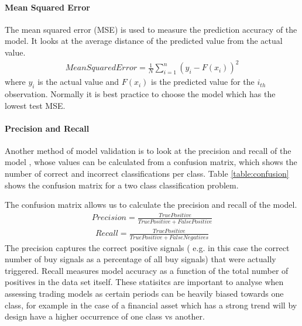 \documentclass[11pt]{article}
\begin{document}
\paragraph{Mean Squared Error}
The mean squared error (MSE) is used to measure the prediction accuracy of the model. It looks at the average distance of the predicted value from the actual value.
\begin{align}
Mean Squared Error = \frac{1}{N}\sum^{n}_{i = 1} (y_{i}-F(x_{i}))^{2} 
\end{align}
where $y_{i}$ is the actual value and $F(x_{i})$ is the predicted value for the $i_{th}$ observation. Normally it is best practice to choose the model which has the lowest test MSE. \newline
\paragraph{Precision and Recall}
Another method of model validation is to look at the precision and recall of the model \cite{Patel2015}, whose values can be calculated from a confusion matrix, which shows the number of correct and incorrect classifications per class. Table \ref{table:confusion}  shows the confusion matrix for a two class classification problem.
\begin{table}[h] 
\centering      %
\caption{Confusion Matrix} %
\label{table:confusion} %
\end{table} 

The confusion matrix allows us to calculate the precision and recall of the model.
\begin{align}
Precision = \frac{True Positive}{True Positive + False Positive} 
\end{align}
\begin{align}
Recall = \frac{True Positive}{True Positive + False Negatives} 
\end{align}
The precision captures the correct positive signals ( e.g. in this case the correct number of buy signals as a percentage of all buy signals) that were actually triggered. Recall measures model accuracy as a function of the total number of positives in the data set itself. These statisitcs are important to analyse when assessing trading models as certain periods can be heavily biased towards one class, for example in the case of a financial asset which has a strong trend will by design have a higher occurrence of one class vs another.
\end{document}
